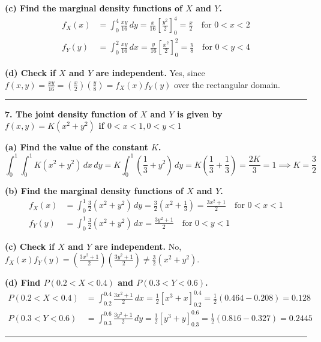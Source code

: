 \documentclass{article}
\begin{document}
\textbf{(c) Find the marginal density functions of $X$ and $Y$.}
\begin{align*}
f_X(x) &= \int_{0}^{4} \frac{xy}{16} \,dy = \frac{x}{16} \left[ \frac{y^2}{2} \right]_0^4 = \frac{x}{2} \quad \text{for } 0 < x < 2 \\
f_Y(y) &= \int_{0}^{2} \frac{xy}{16} \,dx = \frac{y}{16} \left[ \frac{x^2}{2} \right]_0^2 = \frac{y}{8} \quad \text{for } 0 < y < 4
\end{align*}

\textbf{(d) Check if $X$ and $Y$ are independent.}
Yes, since $f(x,y) = \frac{xy}{16} = \left(\frac{x}{2}\right)\left(\frac{y}{8}\right) = f_X(x)f_Y(y)$ over the rectangular domain.

\vspace{1em}
\hrule
\vspace{1em}

\textbf{7. The joint density function of $X$ and $Y$ is given by $f(x,y) = K(x^2 + y^2)$ if $0 < x < 1, 0 < y < 1$}

\textbf{(a) Find the value of the constant $K$.}
$$\int_{0}^{1} \int_{0}^{1} K(x^2 + y^2) \,dx \,dy = K \int_{0}^{1} \left( \frac{1}{3} + y^2 \right) \,dy = K\left(\frac{1}{3} + \frac{1}{3}\right) = \frac{2K}{3} = 1 \implies K = \frac{3}{2}$$

\textbf{(b) Find the marginal density functions of $X$ and $Y$.}
\begin{align*}
f_X(x) &= \int_{0}^{1} \frac{3}{2}(x^2+y^2) \,dy = \frac{3}{2}\left(x^2 + \frac{1}{3}\right) = \frac{3x^2+1}{2} \quad \text{for } 0 < x < 1 \\
f_Y(y) &= \int_{0}^{1} \frac{3}{2}(x^2+y^2) \,dx = \frac{3y^2+1}{2} \quad \text{for } 0 < y < 1
\end{align*}

\textbf{(c) Check if $X$ and $Y$ are independent.}
No, $f_X(x)f_Y(y) = \left(\frac{3x^2+1}{2}\right)\left(\frac{3y^2+1}{2}\right) \neq \frac{3}{2}(x^2+y^2)$.

\textbf{(d) Find $P(0.2 < X < 0.4)$ and $P(0.3 < Y < 0.6)$.}
\begin{align*}
P(0.2 < X < 0.4) &= \int_{0.2}^{0.4} \frac{3x^2+1}{2} \,dx = \frac{1}{2}\left[x^3+x\right]_{0.2}^{0.4} = \frac{1}{2}(0.464 - 0.208) = 0.128 \\
P(0.3 < Y < 0.6) &= \int_{0.3}^{0.6} \frac{3y^2+1}{2} \,dy = \frac{1}{2}\left[y^3+y\right]_{0.3}^{0.6} = \frac{1}{2}(0.816 - 0.327) = 0.2445
\end{align*}

\vspace{1em}
\hrule
\vspace{1em}
\end{document}

